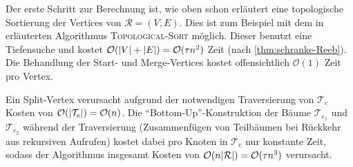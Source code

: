 Der erste Schritt zur Berechnung ist, wie oben schon erläutert eine topologische Sortierung der Vertices von $\mathcal{R}=(V,E)$.
Dies ist zum Beispiel mit dem in \textcite[Sec.~22.4]{cormenIntroduction} erläuterten Algorithmus \textsc{Topological-Sort} möglich.
Dieser benutzt eine Tiefensuche und kostet $\mathcal{O}(\abs*{V} + \abs*{E}) = \mathcal{O}(\tau n^2)$ Zeit (nach \cref{thm:schranke-Reeb}).
Die Behandlung der Start- und Merge-Vertices kostet offensichtlich $\mathcal{O}(1)$ Zeit pro Vertex.

Ein Split-Vertex verursacht aufgrund der notwendigen Traversierung von $\mathcal{T}_e$ Kosten von $\mathcal{O}(\abs*{\mathcal{T}_e}) = \mathcal{O}(n)$.
Die \enquote{Bottom-Up}-Konstruktion der Bäume $\mathcal{T}_{e_1}$ und $\mathcal{T}_{e_2}$ während der Traversierung (Zusammenfügen von Teilbäumen bei Rückkehr aus rekursiven Aufrufen) kostet dabei pro Knoten in $\mathcal{T}_e$ nur konstante Zeit, sodass der Algorithmus insgesamt Kosten von $\mathcal{O}(n \abs*{\mathcal{R}}) = \mathcal{O}(\tau n^3)$ verursacht.

